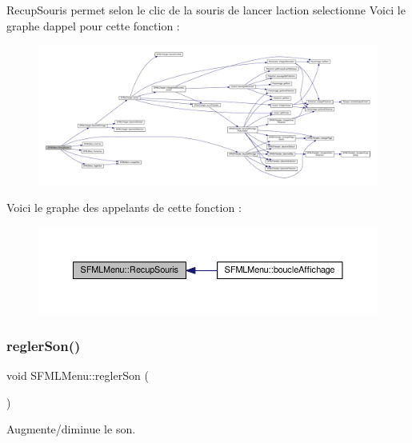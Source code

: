 Recup\+Souris permet selon le clic de la souris de lancer l\textquotesingle{}action selectionne Voici le graphe d\textquotesingle{}appel pour cette fonction \+:\nopagebreak
\begin{figure}[H]
\begin{center}
\leavevmode
\includegraphics[width=350pt]{class_s_f_m_l_menu_aea4285a4b09f175d67fd96aa8456b213_cgraph}
\end{center}
\end{figure}
Voici le graphe des appelants de cette fonction \+:\nopagebreak
\begin{figure}[H]
\begin{center}
\leavevmode
\includegraphics[width=350pt]{class_s_f_m_l_menu_aea4285a4b09f175d67fd96aa8456b213_icgraph}
\end{center}
\end{figure}
\mbox{\label{class_s_f_m_l_menu_a82219455a672aebd4f214ca006dfd7c0}} 
\subsubsection{\texorpdfstring{regler\+Son()}{reglerSon()}}
{\footnotesize\ttfamily void S\+F\+M\+L\+Menu\+::regler\+Son (\begin{DoxyParamCaption}{ }\end{DoxyParamCaption})\hspace{0.3cm}{\ttfamily [private]}}



Augmente/diminue le son. 

